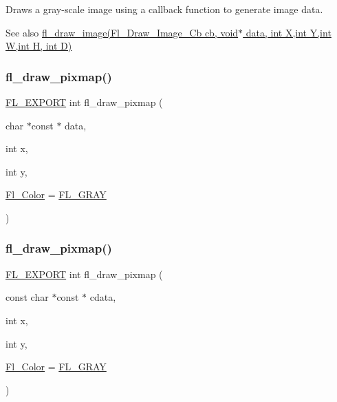 Draws a gray-\/scale image using a callback function to generate image data. \begin{DoxySeeAlso}{See also}
\hyperlink{group__fl__drawings_ga5b8f9bd2d3130529812dcc2c057eee35}{fl\+\_\+draw\+\_\+image(\+Fl\+\_\+\+Draw\+\_\+\+Image\+\_\+\+Cb cb, void$\ast$ data, int X,int Y,int W,int H, int D)} 
\end{DoxySeeAlso}
\mbox{\label{group__fl__drawings_gaebd9b6111b8a511eff62749f1b756a31}} 
\subsubsection{\texorpdfstring{fl\+\_\+draw\+\_\+pixmap()}{fl\_draw\_pixmap()}\hspace{0.1cm}{\footnotesize\ttfamily [1/2]}}
{\footnotesize\ttfamily \hyperlink{_fl___export_8_h_aa9ba29a18aee9d738370a06eeb4470fc}{F\+L\+\_\+\+E\+X\+P\+O\+RT} int fl\+\_\+draw\+\_\+pixmap (\begin{DoxyParamCaption}\item[{char $\ast$const $\ast$}]{data,  }\item[{int}]{x,  }\item[{int}]{y,  }\item[{\hyperlink{_enumerations_8_h_a8b762953646f8abee866061f1af78a6a}{Fl\+\_\+\+Color}}]{ = {\ttfamily \hyperlink{_enumerations_8_h_aabb3b3628ea5baa2ba176201ed5d2aba}{F\+L\+\_\+\+G\+R\+AY}} }\end{DoxyParamCaption})}

\mbox{\label{group__fl__drawings_gab830e417d8f17fcd00acdb96711b9119}} 
\subsubsection{\texorpdfstring{fl\+\_\+draw\+\_\+pixmap()}{fl\_draw\_pixmap()}\hspace{0.1cm}{\footnotesize\ttfamily [2/2]}}
{\footnotesize\ttfamily \hyperlink{_fl___export_8_h_aa9ba29a18aee9d738370a06eeb4470fc}{F\+L\+\_\+\+E\+X\+P\+O\+RT} int fl\+\_\+draw\+\_\+pixmap (\begin{DoxyParamCaption}\item[{const char $\ast$const $\ast$}]{cdata,  }\item[{int}]{x,  }\item[{int}]{y,  }\item[{\hyperlink{_enumerations_8_h_a8b762953646f8abee866061f1af78a6a}{Fl\+\_\+\+Color}}]{ = {\ttfamily \hyperlink{_enumerations_8_h_aabb3b3628ea5baa2ba176201ed5d2aba}{F\+L\+\_\+\+G\+R\+AY}} }\end{DoxyParamCaption})}

